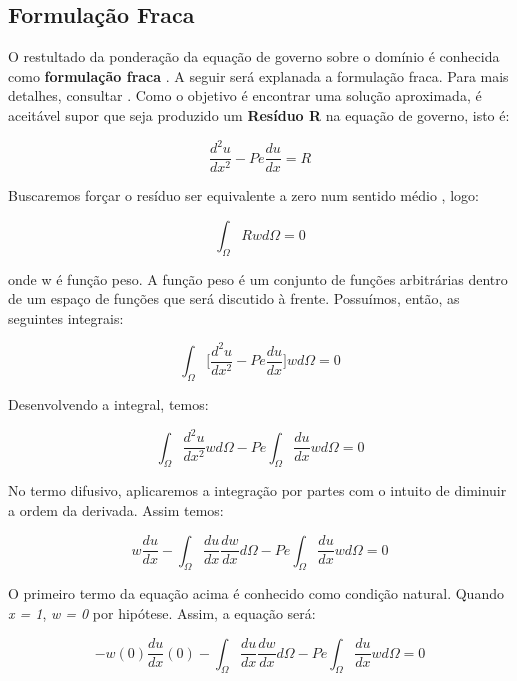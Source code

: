 \subsection{Formulação Fraca}

O restultado da ponderação da equação de
governo sobre o domínio é conhecida como
\textbf{formulação fraca} \cite{anjos2007}.
A seguir será explanada a formulação fraca.
Para mais detalhes, consultar \cite{brenner1994}.
Como o objetivo é encontrar uma solução
aproximada, é aceitável supor que seja produzido
um \textbf{Resíduo R} na equação de governo,
isto é:

\begin{equation}
 \frac{d^2 u}{dx^2} - \textit{Pe} \frac{du}{dx} = R
\end{equation}

Buscaremos forçar o resíduo ser equivalente
a zero num sentido médio \cite{finlayson1972}, logo:

\begin{equation}
 \int_{\Omega} Rwd\Omega = 0
\end{equation}


onde w é função peso. A função peso
é um conjunto de funções arbitrárias
dentro de um espaço de funções que será
discutido à frente. Possuímos, então,
as seguintes integrais:

\begin{equation}
 \int_{\Omega} \Bigg[\frac{d^2 u}{dx^2} - \textit{Pe} \frac{du}{dx} \Bigg] wd\Omega = 0
\end{equation}

Desenvolvendo a integral, temos:

\begin{equation}
 \int_{\Omega} \frac{d^2 u}{dx^2}wd\Omega - \textit{Pe}\int_{\Omega} \frac{du}{dx}wd\Omega = 0
\end{equation}

No termo difusivo, aplicaremos a integração
por partes com o intuito de diminuir a ordem
da derivada. Assim temos:

\begin{equation} 
  w\frac{du}{dx} - \int_{\Omega} \frac{du}{dx} \frac{dw}{dx} d\Omega 
  - \textit{Pe}\int_{\Omega} \frac{du}{dx}wd\Omega = 0
\end{equation}

O primeiro termo da equação acima é conhecido
como condição natural. Quando \textit{x = 1},
\textit{w = 0} por hipótese. Assim, a equação será:

\begin{equation}
  - w(0)\frac{du}{dx}(0) - \int_{\Omega} \frac{du}{dx}  \frac{dw}{dx} d\Omega 
  - \textit{Pe}\int_{\Omega} \frac{du}{dx}wd\Omega = 0
\end{equation}

